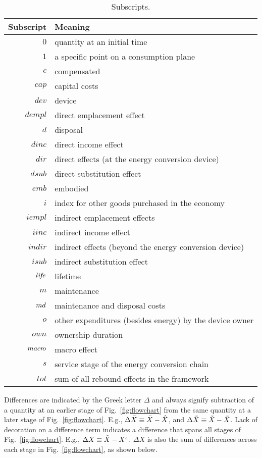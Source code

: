 \begin{table}
\centering
\caption{Subscripts.}
\begin{tabular}{r l}
  \toprule
  Subscript & Meaning \\
  \midrule
  $0$ & quantity at an initial time \\
  $1$ & a specific point on a consumption plane \\
  $c$ & compensated \\
  $cap$ & capital costs \\
  $dev$ & device \\
  $dempl$ & direct emplacement effect \\
  $d$ & disposal \\
  $dinc$ & direct income effect \\
  $dir$ & direct effects (at the energy conversion device) \\
  $dsub$ & direct substitution effect \\
  $emb$ & embodied \\
  $i$ & index for other goods purchased in the economy \\
  $iempl$ & indirect emplacement effects \\
  $iinc$ & indirect income effect \\
  $indir$ & indirect effects (beyond the energy conversion device) \\
  $isub$ & indirect substitution effect \\
  $li\!f\!e$ & lifetime \\
  $m$ & maintenance \\
  $md$ & maintenance and disposal costs \\
  $o$ & other expenditures (besides energy) by the device owner \\
  $own$ & ownership duration \\
  $macr\!o$ & macro effect \\
  $s$ & service stage of the energy conversion chain \\
  $tot$ & sum of all rebound effects in the framework \\
  \bottomrule
\end{tabular}
\label{tab:subscripts}
\end{table}


Differences are indicated by the Greek letter $\Delta$ and always
signify subtraction of a quantity at an earlier stage of Fig.~\ref{fig:flowchart}
from the same quantity at a later stage of Fig.~\ref{fig:flowchart}.
E.g.,
$\Delta \bar{X} \equiv \bar{X} - \hat{X}$, and
$\Delta \tilde{X} \equiv \tilde{X} - \bar{X}$.
Lack of decoration on a difference term indicates a difference that spans all stages of Fig.~\ref{fig:flowchart}.
E.g., $\Delta X \equiv \tilde{X} - {}{X}^{\scriptscriptstyle \circ}$.
$\Delta X$ is also the sum of differences across each stage in Fig.~\ref{fig:flowchart},
as shown below.

